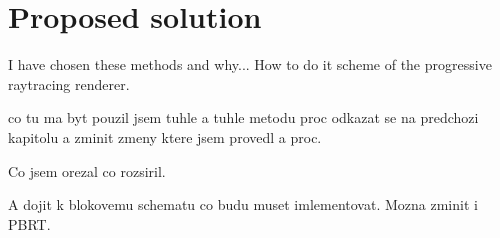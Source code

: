 \chapter{Proposed solution}
I have chosen these methods and why... How to do it scheme of the progressive raytracing renderer.



co tu ma byt
pouzil jsem tuhle a tuhle metodu proc odkazat se na predchozi kapitolu a zminit zmeny ktere jsem provedl a proc.

Co jsem orezal co rozsiril.

A dojit k blokovemu schematu co budu muset imlementovat. Mozna zminit i PBRT. 



